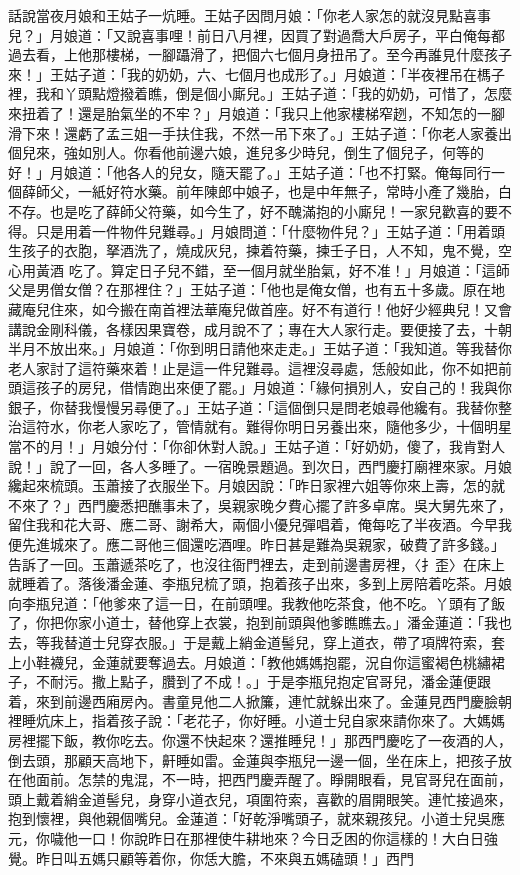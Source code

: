 \begin{showcontents}{}
話說當夜月娘和王姑子一炕睡。王姑子因問月娘：「你老人家怎的就沒見點喜事兒？」月娘道：「又說喜事哩！前日八月裡，因買了對過喬大戶房子，平白俺每都過去看，上他那樓梯，一腳躡滑了，把個六七個月身扭吊了。至今再誰見什麼孩子來！」王姑子道：「我的奶奶，六、七個月也成形了。」月娘道：「半夜裡吊在榪子裡，我和丫頭點燈撥着瞧，倒是個小廝兒。」王姑子道：「我的奶奶，可惜了，怎麼來扭着了！還是胎氣坐的不牢？」月娘道：「我只上他家樓梯窄趔，不知怎的一腳滑下來！還虧了孟三姐一手扶住我，不然一吊下來了。」王姑子道：「你老人家養出個兒來，強如別人。你看他前邊六娘，進兒多少時兒，倒生了個兒子，何等的好！」月娘道：「他各人的兒女，隨天罷了。」王姑子道：「也不打緊。俺每同行一個薛師父，一紙好符水藥。前年陳郎中娘子，也是中年無子，常時小產了幾胎，白不存。也是吃了薛師父符藥，如今生了，好不醜滿抱的小廝兒！一家兒歡喜的要不得。只是用着一件物件兒難尋。」月娘問道：「什麼物件兒？」王姑子道：「用着頭生孩子的衣胞，拏酒洗了，燒成灰兒，揀着符藥，揀壬子日，人不知，鬼不覺，空心用黃酒 吃了。算定日子兒不錯，至一個月就坐胎氣，好不准！」月娘道：「這師父是男僧女僧？在那裡住？」王姑子道：「他也是俺女僧，也有五十多歲。原在地藏庵兒住來，如今搬在南首裡法華庵兒做首座。好不有道行！他好少經典兒！又會講說金剛科儀，各樣因果寶卷，成月說不了；專在大人家行走。要便接了去，十朝半月不放出來。」月娘道：「你到明日請他來走走。」王姑子道：「我知道。等我替你老人家討了這符藥來着！止是這一件兒難尋。這裡沒尋處，恁般如此，你不如把前頭這孩子的房兒，借情跑出來便了罷。」月娘道：「緣何損別人，安自己的！我與你銀子，你替我慢慢另尋便了。」王姑子道：「這個倒只是問老娘尋他纔有。我替你整治這符水，你老人家吃了，管情就有。難得你明日另養出來，隨他多少，十個明星當不的月！」月娘分付：「你卻休對人說。」王姑子道：「好奶奶，傻了，我肯對人說！」說了一回，各人多睡了。一宿晚景題過。到次日，西門慶打廟裡來家。月娘纔起來梳頭。玉蕭接了衣服坐下。月娘因說：「昨日家裡六姐等你來上壽，怎的就不來了？」西門慶悉把醮事未了，吳親家晚夕費心擺了許多卓席。吳大舅先來了，留住我和花大哥、應二哥、謝希大，兩個小優兒彈唱着，俺每吃了半夜酒。今早我便先進城來了。應二哥他三個還吃酒哩。昨日甚是難為吳親家，破費了許多錢。」告訴了一回。玉蕭遞茶吃了，也沒往衙門裡去，走到前邊書房裡，〈扌歪〉在床上就睡着了。落後潘金蓮、李瓶兒梳了頭，抱着孩子出來，多到上房陪着吃茶。月娘向李瓶兒道：「他爹來了這一日，在前頭哩。我教他吃茶食，他不吃。丫頭有了飯了，你把你家小道士，替他穿上衣裳，抱到前頭與他爹瞧瞧去。」潘金蓮道：「我也去，等我替道士兒穿衣服。」于是戴上綃金道髻兒，穿上道衣，帶了項牌符索，套上小鞋襪兒，金蓮就要奪過去。月娘道：「教他媽媽抱罷，況自你這蜜褐色桃繡裙子，不耐污。撒上點子，臢到了不成！。」于是李瓶兒抱定官哥兒，潘金蓮便跟着，來到前邊西廂房內。書童見他二人掀簾，連忙就躲出來了。金蓮見西門慶臉朝裡睡炕床上，指着孩子說：「老花子，你好睡。小道士兒自家來請你來了。大媽媽房裡擺下飯，教你吃去。你還不快起來？還推睡兒！」那西門慶吃了一夜酒的人，倒去頭，那顧天高地下，鼾睡如雷。金蓮與李瓶兒一邊一個，坐在床上，把孩子放在他面前。怎禁的鬼混，不一時，把西門慶弄醒了。睜開眼看，見官哥兒在面前，頭上戴着綃金道髻兒，身穿小道衣兒，項圍符索，喜歡的眉開眼笑。連忙接過來，抱到懷裡，與他親個嘴兒。金蓮道：「好乾淨嘴頭子，就來親孩兒。小道士兒吳應元，你噦他一口！你說昨日在那裡使牛耕地來？今日乏困的你這樣的！大白日強覺。昨日叫五媽只顧等着你，你恁大膽，不來與五媽磕頭！」西門
\end{showcontents}
